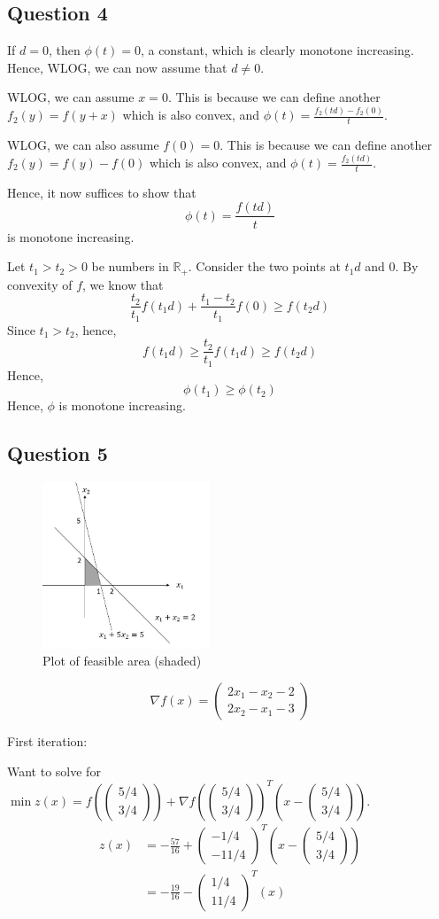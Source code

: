 \documentclass{article}
\newcommand{\R}{\mathbb{R}}
\newcommand{\vv}[2]{\begin{pmatrix}#1\\#2\end{pmatrix}}
\begin{document}
\subsection*{Question 4}
If $d=0$, then $\phi(t) = 0$, a constant, which is clearly monotone increasing. Hence, WLOG, we can now assume that $d \neq 0$.

WLOG, we can assume $x=0$. This is because we can define another $f_2(y) = f(y+x)$ which is also convex, and $\phi(t) = \frac{f_2(td)-f_2(0)}{t}$.

WLOG, we can also assume $f(0)=0$. This is because we can define another $f_2(y) = f(y)-f(0)$ which is also convex, and $\phi(t) = \frac{f_2(td)}{t}$.

Hence, it now suffices to show that
\[\phi(t) = \frac{f(td)}{t}\]
is monotone increasing.

Let $t_1 > t_2 > 0$ be numbers in $\R_+$. Consider the two points at $t_1d$ and $0$. By convexity of $f$, we know that
\[\frac{t_2}{t_1} f(t_1 d) + \frac{t_1-t_2}{t_1} f(0) \geq f(t_2d)\]
Since $t_1 > t_2$, hence,
\[f(t_1 d) \geq \frac{t_2}{t_1} f(t_1 d) \geq f(t_2d)\]
Hence,
\[\phi(t_1) \geq \phi(t_2)\]
Hence, $\phi$ is monotone increasing.

\subsection*{Question 5}

\begin{figure}[h]
\centering
\includegraphics[width=5cm]{graph}
\caption{Plot of feasible area (shaded)}
\end{figure}

\[\nabla f(x) = \vv{2x_1 - x_2 - 2}{2x_2 - x_1 - 3}\]

First iteration:

Want to solve for $\min z(x) = f(\vv{5/4}{3/4}) + \nabla f(\vv{5/4}{3/4})^T(x-\vv{5/4}{3/4})$.
\begin{align*}
z(x) &= -\frac{57}{16} + \vv{-1/4}{-11/4}^T(x-\vv{5/4}{3/4}) \\
    &= -\frac{19}{16} - \vv{1/4}{11/4}^T (x)
\end{align*}
\end{document}
